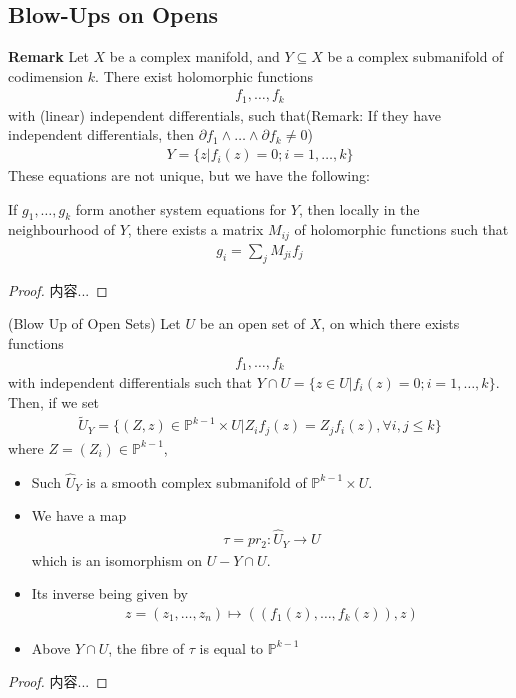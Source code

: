 \documentclass[Total.tex]{subfiles}
\begin{document}
			\subsection{Blow-Ups on Opens}
			\textbf{Remark} Let $X$ be a complex manifold, and $Y\subseteq X$ be a complex submanifold of codimension $k$. There exist holomorphic functions
			\begin{gather*}
				f_1,\dots,f_k
			\end{gather*}
			with (linear) independent differentials, such that(Remark: If they have independent differentials, then $\partial f_1\wedge\dots\wedge \partial f_k\not=0$)
			\begin{gather*}
				Y=\{z|f_i(z)=0;i=1,\dots,k\}
			\end{gather*}
			These equations are not unique, but we have the following:
			\begin{lemma}
				If $g_1,\dots,g_k$ form another system equations for $Y$, then locally in the neighbourhood of $Y$, there exists a matrix $M_{ij}$ of holomorphic functions such that
				\begin{gather*}
					g_i=\sum_j M_{ji} f_j
				\end{gather*}
			\end{lemma}
			\begin{proof}
				内容...
			\end{proof}
			\begin{Def}
				(Blow Up of Open Sets) Let $U$ be an open set of $X$, on which there exists functions
				\begin{gather*}
					f_1,\dots,f_k
				\end{gather*}
				with independent differentials such that $Y\cap U=\{z\in U|f_i(z)=0;i=1,\dots,k\}$. Then, if we set
				\begin{gather*}
					\tilde{U}_Y=\{(Z,z)\in \mathbb{P}^{k-1}\times U|Z_i f_j(z)=Z_jf_i(z),\forall i,j\leq k\}
				\end{gather*}
				where $Z=(Z_i)\in \mathbb{P}^{k-1}$, 
			\end{Def}
			
			\begin{lemma}
				\begin{itemize}
					\item Such $\hat{U}_Y$ is a smooth complex submanifold of $\mathbb{P}^{k-1}\times U$. 
					\item We have a map
					\begin{gather*}
						\tau=pr_2:\hat{U}_Y\rightarrow U
					\end{gather*}
					which is an isomorphism on $U-Y\cap U$. 
					\item Its inverse being given by
					\begin{gather*}
						z=(z_1,\dots,z_n)\mapsto ((f_1(z),\dots,f_k(z)),z)
					\end{gather*}
					\item Above $Y\cap U$, the fibre of $\tau$ is equal to $\mathbb{P}^{k-1}$
				\end{itemize}
			\end{lemma}
			\begin{proof}
				内容...
			\end{proof}
			
\end{document}
